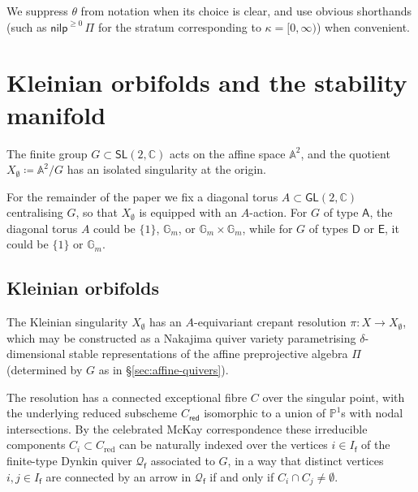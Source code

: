 \documentclass[reqno,a4paper]{amsart}
\newcommand{\A}{\mathbb{A}}
\newcommand{\C}{\mathbb{C}}
\newcommand{\G}{\mathbb{G}}
\newcommand{\PP}{\mathbb{P}}
\newcommand{\sfA}{\mathsf{A}}
\newcommand{\sfD}{\mathsf{D}}
\newcommand{\sfE}{\mathsf{E}}
\newcommand{\sff}{\mathsf{f}}
\newcommand{\nilp}{\mathsf{nilp}}
\newcommand{\qvfin}{\mathcal{Q}_\sff}
\newcommand{\rsv}{X}
\newcommand{\ssv}{X_\emptyset}
\newcommand{\GL}{\mathsf{GL}}
\newcommand{\SL}{\mathsf{SL}}
\theoremstyle{basic-theorem}
\numberwithin{equation}{section}
\begin{document}
We suppress $\theta$ from notation when its choice is clear, and use obvious shorthands (such as $\nilp^{\geqslant 0}\, \Pi$ for the stratum corresponding to $\kappa=[0,\infty)$) when convenient.

\section{Kleinian orbifolds and the stability manifold}\label{sec:perverse-coherent-sheaves}

The finite group $G\subset \SL(2,\C)$ acts on the affine space $\A^2$, and the quotient $\ssv\coloneqq \A^2/G$ has an isolated singularity at the origin.


For the remainder of the paper we fix a diagonal torus $A\subset \GL(2,\C)$ centralising $G$, so that $\ssv$ is equipped with an $A$-action. For $G$ of type $\sfA$, the diagonal torus $A$ could be $\{1\}$, $\G_m$, or $\G_m\times\G_m$, while for $G$ of types $\sfD$ or $\sfE$, it could be $\{1\}$ or $\G_m$.

\subsection{Kleinian orbifolds}\label{subsec:kleinian-orbifolds}

The Kleinian singularity $\ssv$ has an $A$-equivariant crepant resolution $\pi\colon \rsv\to \ssv$, which may be constructed as a Nakajima quiver variety parametrising $\delta$-dimensional stable representations of the affine preprojective algebra $\Pi$ (determined by $G$ as in \S\ref{sec:affine-quivers}).

The resolution has a connected exceptional fibre $C$ over the singular point, with the underlying reduced subscheme $C_\mathsf{red}$ isomorphic to a union of $\PP^1$s with nodal intersections. By the celebrated McKay correspondence \cite{GSV_McKay} these irreducible components $C_i\subset C_\text{red}$ can be naturally indexed over the vertices $i\in I_\sff$ of the finite-type Dynkin quiver $\qvfin$ associated to $G$, in a way that distinct vertices $i,j\in I_\sff$ are connected by an arrow in $\qvfin$ if and only if $C_i\cap C_j\neq \emptyset$.
\end{document}
